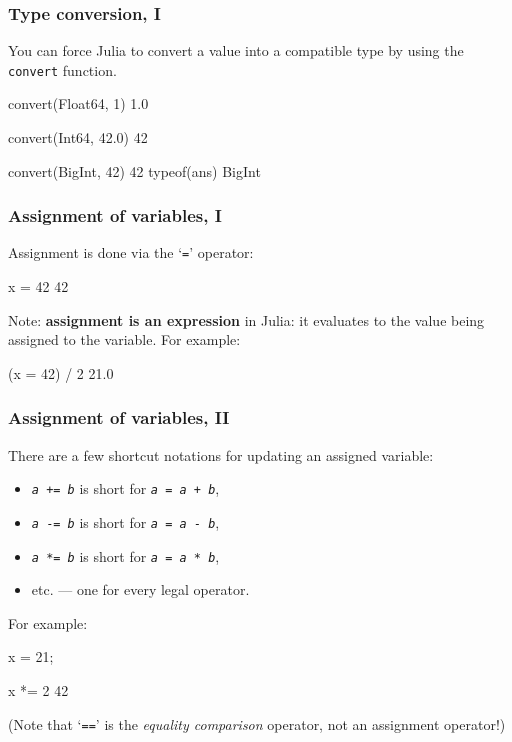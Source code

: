 \documentclass[english,serif,mathserif,xcolor=pdftex,dvipsnames,table]{beamer}
\begin{document}
\begin{frame}[fragile]
  \frametitle{Type conversion, I}
  You can force Julia to convert a value into a compatible type by
  using the \texttt{convert} function.

  \+ %
\begin{semiverbatim}
\julia convert(Float64, 1)
1.0

\julia convert(Int64, 42.0)
42

\julia convert(BigInt, 42)
42
\julia typeof(ans)
BigInt
\end{semiverbatim}
\end{frame}


\begin{frame}
  \frametitle{Assignment of variables, I}
  Assignment is done via the `\texttt{=}' operator:
\begin{semiverbatim}
\julia x = 42
42
\end{semiverbatim}

  \+ Note: \textbf{assignment is an expression} in Julia: it evaluates
  to the value being assigned to the variable.  For example:
\begin{semiverbatim}
\julia (x = 42) / 2
21.0
\end{semiverbatim}
\end{frame}


\begin{frame}[fragile]
  \frametitle{Assignment of variables, II}
  There are a few shortcut notations for updating an assigned variable:
  \begin{itemize}
  \item[] \texttt{\emph{a} += \emph{b}} is short for \texttt{\emph{a} = \emph{a} + \emph{b}},
  \item[] \texttt{\emph{a} -= \emph{b}} is short for \texttt{\emph{a} = \emph{a} - \emph{b}},
  \item[] \texttt{\emph{a} *= \emph{b}} is short for \texttt{\emph{a} = \emph{a} * \emph{b}},
  \item[]   etc. --- one for every legal operator.
  \end{itemize}

  \+ For example:
\begin{semiverbatim}
\julia x = 21;

\julia x *= 2
42
\end{semiverbatim}

  \+
  (Note that `\texttt{==}' is the \emph{equality comparison} operator, not an assignment operator!)
\end{frame}
\end{document}
